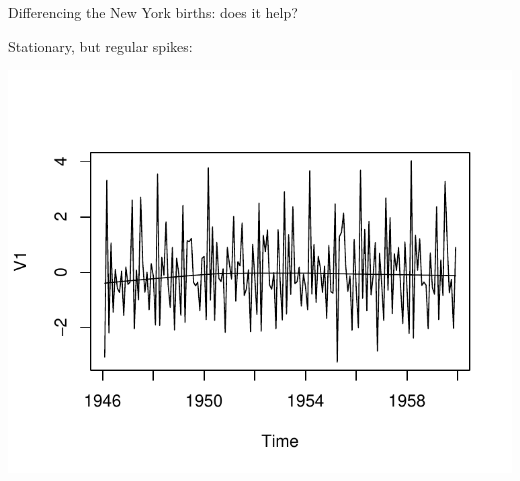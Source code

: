 \begin{frame}[fragile]{Differencing the New York births: does it help?}
  
Stationary, but regular spikes:  
  
\begin{knitrout}
\color{fgcolor}\begin{kframe}
\begin{alltt}
\hlkwb{=}
\hlstd{(}
\end{alltt}
\end{kframe}
\includegraphics[width=\maxwidth]{figure/sklsalhsa-1} 

\end{knitrout}
  
\end{frame}

